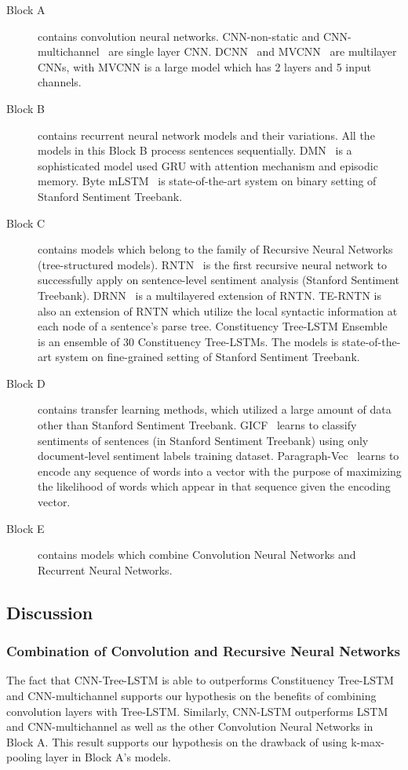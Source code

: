 \begin{description}
	\item[Block A] contains convolution neural networks.
	CNN-non-static and CNN-multichannel~\cite{KimCNN} are single layer CNN.
	DCNN~\cite{DCNN} and MVCNN~\cite{2-layer-cnn} are multilayer CNNs, with MVCNN is a large model  which has 2 layers and 5 input channels.
	\item[Block B] contains recurrent neural network models and their variations.
	All the models in this Block B process sentences sequentially.
	DMN~\cite{attention-gru} is a sophisticated model used GRU with attention mechanism and episodic memory.
	Byte mLSTM~\cite{mlstm} is state-of-the-art system on binary setting of Stanford Sentiment Treebank.
	\item[Block C] contains models which belong to the family of Recursive Neural Networks (tree-structured models).
	RNTN~\cite{socher2013recursive} is the first recursive neural network to successfully apply on sentence-level sentiment analysis (Stanford Sentiment Treebank).
	DRNN~\cite{IrsoyDRNN} is a multilayered extension of RNTN.
	TE-RNTN is also an extension of RNTN which utilize the local syntactic information at each node of a sentence's parse tree.
	Constituency Tree-LSTM Ensemble~\cite{LooksHHN17} is an ensemble of 30 Constituency Tree-LSTMs.
	The models is state-of-the-art system on fine-grained setting of Stanford Sentiment Treebank.
	\item[Block D] contains transfer learning methods, which utilized a large amount of data other than Stanford Sentiment Treebank.
	GICF~\cite{group-instance} learns to classify sentiments of sentences (in Stanford Sentiment Treebank) using only document-level sentiment labels training dataset.
	Paragraph-Vec~\cite{ParagraphVec} learns to encode any sequence of words into a vector with the purpose of maximizing the likelihood of words which appear in that sequence given the encoding vector.
	\item[Block E] contains models which combine Convolution Neural Networks and Recurrent Neural Networks.
\end{description}
\subsection{Discussion}
\subsubsection{Combination of Convolution and Recursive Neural Networks}
The fact that CNN-Tree-LSTM is able to outperforms Constituency Tree-LSTM~\cite{treeLSTM} and CNN-multichannel\cite{KimCNN} supports our hypothesis on the benefits of combining convolution layers with Tree-LSTM.
Similarly, CNN-LSTM outperforms LSTM~\cite{treeLSTM} and CNN-multichannel\cite{KimCNN} as well as the other Convolution Neural Networks in Block A.
This result supports our hypothesis on the drawback of using k-max-pooling layer in Block A's models.
